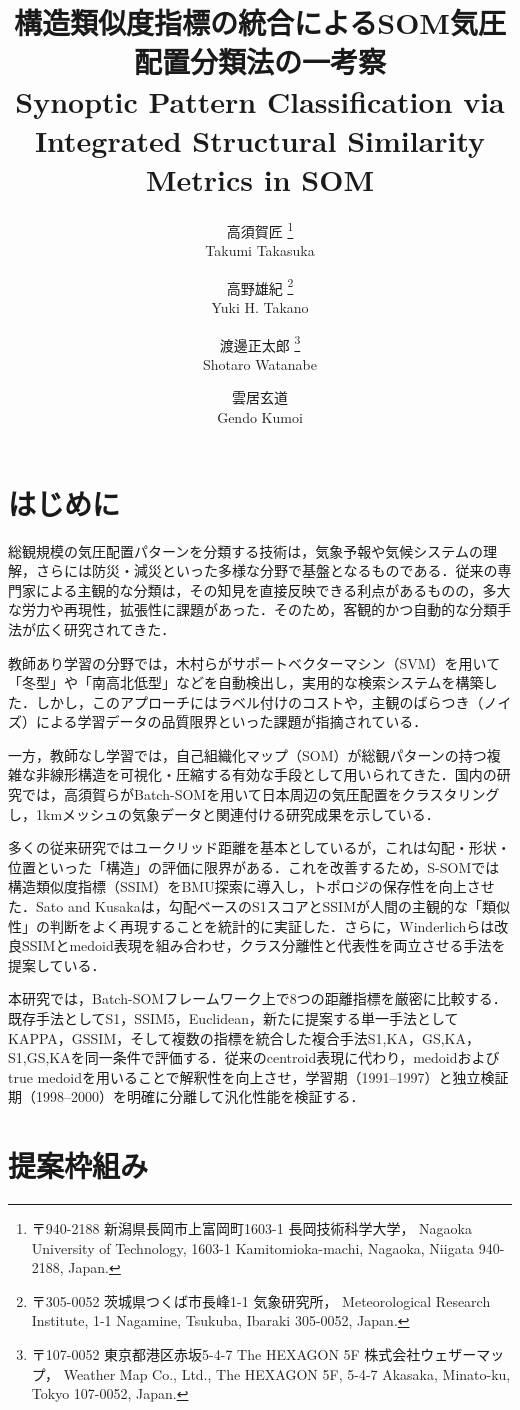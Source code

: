\documentclass{jarticle}
\title{
  構造類似度指標の統合によるSOM気圧配置分類法の一考察\\
  Synoptic Pattern Classification via Integrated Structural Similarity Metrics in SOM
}
\author{
  高須賀匠
  \thanks{ %
    〒940-2188 新潟県長岡市上富岡町1603-1 長岡技術科学大学，
    Nagaoka University of Technology, 1603-1 Kamitomioka-machi, Nagaoka, Niigata 940-2188, Japan.
  }\\
  Takumi Takasuka
  \and
  高野雄紀
  \thanks{
    〒305-0052 茨城県つくば市長峰1-1 気象研究所，
    Meteorological Research Institute, 1-1 Nagamine, Tsukuba, Ibaraki 305-0052, Japan.
  }\\
  Yuki H. Takano
  \and
  渡邊正太郎
  \thanks {
    〒107-0052 東京都港区赤坂5-4-7 The HEXAGON 5F 株式会社ウェザーマップ，
    Weather Map Co., Ltd., The HEXAGON 5F, 5-4-7 Akasaka, Minato-ku, Tokyo 107-0052, Japan.
  }\\
  Shotaro Watanabe
  \and
  雲居玄道
  \footnotemark[1]\\
  Gendo Kumoi
}
\theoremstyle{definition}
\begin{document}
\maketitle

\section{はじめに}
総観規模の気圧配置パターンを分類する技術は，気象予報や気候システムの理解，さらには防災・減災といった多様な分野で基盤となるものである．従来の専門家による主観的な分類は，その知見を直接反映できる利点があるものの，多大な労力や再現性，拡張性に課題があった．そのため，客観的かつ自動的な分類手法が広く研究されてきた．

教師あり学習の分野では，木村ら\cite{木村広希2009サポートベクターマシンを用いた気圧配置検出手法の提案}がサポートベクターマシン（SVM）を用いて「冬型」や「南高北低型」などを自動検出し，実用的な検索システムを構築した．しかし，このアプローチにはラベル付けのコストや，主観のばらつき（ノイズ）による学習データの品質限界といった課題が指摘されている．

一方，教師なし学習では，自己組織化マップ（SOM）が総観パターンの持つ複雑な非線形構造を可視化・圧縮する有効な手段として用いられてきた\cite{philippopoulos2014performance,jiang2013classification}．国内の研究では，高須賀ら\cite{takasuka2024}がBatch-SOMを用いて日本周辺の気圧配置をクラスタリングし，1kmメッシュの気象データと関連付ける研究成果を示している．

多くの従来研究ではユークリッド距離を基本としているが，これは勾配・形状・位置といった「構造」の評価に限界がある．これを改善するため，S-SOM\cite{doan2021s}では構造類似度指標（SSIM）をBMU探索に導入し，トポロジの保存性を向上させた．Sato and Kusaka\cite{SATOTakuto20212021-047}は，勾配ベースのS1スコアとSSIMが人間の主観的な「類似性」の判断をよく再現することを統計的に実証した．さらに，Winderlichら\cite{winderlich2024classification}は改良SSIMとmedoid表現を組み合わせ，クラス分離性と代表性を両立させる手法を提案している．

本研究では，Batch-SOMフレームワーク上で8つの距離指標を厳密に比較する．既存手法としてS1，SSIM5，Euclidean，新たに提案する単一手法としてKAPPA，GSSIM，そして複数の指標を統合した複合手法S1,KA，GS,KA，S1,GS,KAを同一条件で評価する．従来のcentroid表現に代わり，medoidおよびtrue medoidを用いることで解釈性を向上させ，学習期（1991–1997）と独立検証期（1998–2000）を明確に分離して汎化性能を検証する．

\section{提案枠組み}
\end{document}
